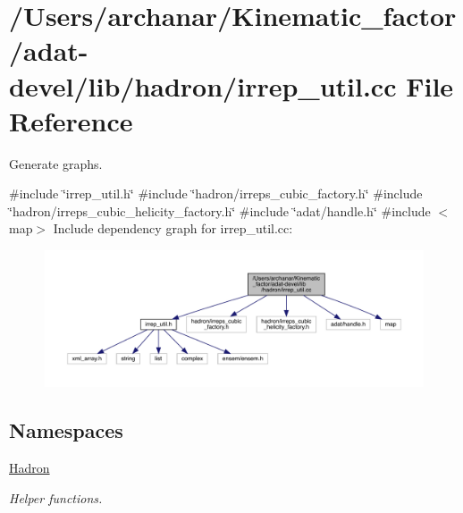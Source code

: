 \hypertarget{adat-devel_2lib_2hadron_2irrep__util_8cc}{}\section{/\+Users/archanar/\+Kinematic\+\_\+factor/adat-\/devel/lib/hadron/irrep\+\_\+util.cc File Reference}
\label{adat-devel_2lib_2hadron_2irrep__util_8cc}


Generate graphs.  


{\ttfamily \#include \char`\"{}irrep\+\_\+util.\+h\char`\"{}}\newline
{\ttfamily \#include \char`\"{}hadron/irreps\+\_\+cubic\+\_\+factory.\+h\char`\"{}}\newline
{\ttfamily \#include \char`\"{}hadron/irreps\+\_\+cubic\+\_\+helicity\+\_\+factory.\+h\char`\"{}}\newline
{\ttfamily \#include \char`\"{}adat/handle.\+h\char`\"{}}\newline
{\ttfamily \#include $<$map$>$}\newline
Include dependency graph for irrep\+\_\+util.\+cc\+:
\nopagebreak
\begin{figure}[H]
\begin{center}
\leavevmode
\includegraphics[width=350pt]{db/d71/adat-devel_2lib_2hadron_2irrep__util_8cc__incl}
\end{center}
\end{figure}
\subsection*{Namespaces}
\begin{DoxyCompactItemize}
\item 
 \mbox{\hyperlink{namespaceHadron}{Hadron}}
\begin{DoxyCompactList}\small\item\em Helper functions. \end{DoxyCompactList}\end{DoxyCompactItemize}

